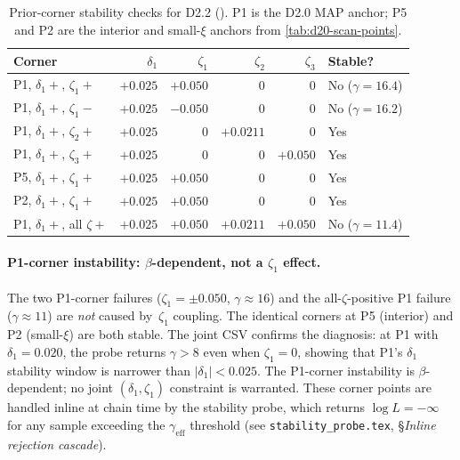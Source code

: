 \begin{table}[h]
\centering
\begin{tabular}{lrrrrl}
\toprule
Corner & $\delta_1$ & $\zeta_1$ & $\zeta_2$ & $\zeta_3$ & Stable? \\
\midrule
P1, $\delta_1{+}$, $\zeta_1{+}$ & $+0.025$ & $+0.050$ & $0$ & $0$ & No ($\gamma=16.4$) \\
P1, $\delta_1{+}$, $\zeta_1{-}$ & $+0.025$ & $-0.050$ & $0$ & $0$ & No ($\gamma=16.2$) \\
P1, $\delta_1{+}$, $\zeta_2{+}$ & $+0.025$ & $0$ & $+0.0211$ & $0$ & Yes \\
P1, $\delta_1{+}$, $\zeta_3{+}$ & $+0.025$ & $0$ & $0$ & $+0.050$ & Yes \\
P5, $\delta_1{+}$, $\zeta_1{+}$ & $+0.025$ & $+0.050$ & $0$ & $0$ & Yes \\
P2, $\delta_1{+}$, $\zeta_1{+}$ & $+0.025$ & $+0.050$ & $0$ & $0$ & Yes \\
P1, $\delta_1{+}$, all $\zeta{+}$ & $+0.025$ & $+0.050$ & $+0.0211$ & $+0.050$ & No ($\gamma=11.4$) \\
\bottomrule
\end{tabular}
\caption{Prior-corner stability checks for D2.2
().  P1 is the D2.0 MAP anchor;
P5 and P2 are the interior and small-$\xi$ anchors from
\cref{tab:d20-scan-points}.}
\label{tab:d22-corner}
\end{table}

\paragraph{P1-corner instability: $\beta$-dependent, not a $\zeta_1$ effect.}
The two P1-corner failures ($\zeta_1=\pm0.050$, $\gamma\approx16$) and
the all-$\zeta$-positive P1 failure ($\gamma\approx11$) are \emph{not}
caused by~$\zeta_1$ coupling.  The identical corners at P5 (interior)
and P2 (small-$\xi$) are both stable.  The joint CSV confirms the
diagnosis: at P1 with $\delta_1=0.020$, the probe returns $\gamma>8$
even when $\zeta_1=0$, showing that P1's $\delta_1$ stability window
is narrower than $|\delta_1|<0.025$.  The P1-corner instability is
$\beta$-dependent; no joint $(\delta_1,\zeta_1)$ constraint is
warranted.  These corner points are handled inline at chain time by
the stability probe, which returns $\log L=-\infty$ for any sample
exceeding the $\gamma_\mathrm{eff}$ threshold (see
\texttt{stability\_probe.tex}, \S\emph{Inline rejection cascade}).

